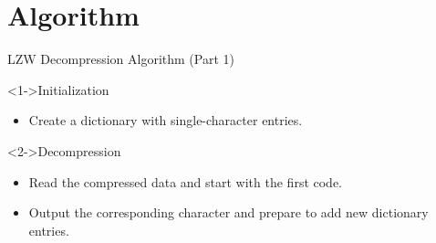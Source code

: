 \documentclass{beamer}
\begin{document}
\section{Algorithm}
\begin{frame}{LZW Decompression Algorithm (Part 1)}
    \begin{block}<1->{Initialization}
        \begin{itemize}
            \item Create a dictionary with single-character entries.
        \end{itemize}
    \end{block}
    
    \begin{block}<2->{Decompression}
        \begin{itemize}
            \item Read the compressed data and start with the first code.
            \item Output the corresponding character and prepare to add new dictionary entries.
        \end{itemize}
    \end{block}
\end{frame}
\end{document}
